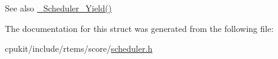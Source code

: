 \begin{DoxySeeAlso}{See also}
\mbox{\hyperlink{group__RTEMSScoreScheduler_ga37b1082aa1832c4a73154d5fc92dceaa}{\+\_\+\+Scheduler\+\_\+\+Yield()}} 
\end{DoxySeeAlso}


The documentation for this struct was generated from the following file\+:\begin{DoxyCompactItemize}
\item 
cpukit/include/rtems/score/\mbox{\hyperlink{score_2scheduler_8h}{scheduler.\+h}}\end{DoxyCompactItemize}

